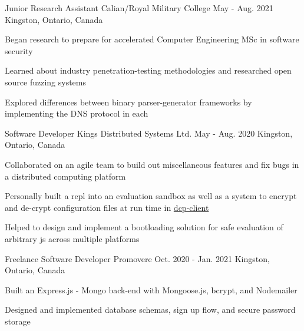 

\begin{cventries}

  \cventry
    {Junior Research Assistant} %
    {Calian/Royal Military College} %
    {May - Aug. 2021} %
    {Kingston, Ontario, Canada} %
    {
      \begin{cvitems} %
        \item{Began research to prepare for accelerated Computer Engineering MSc in software security}
        \item{Learned about industry penetration-testing methodologies and researched open source fuzzing systems}
        \item{Explored differences between binary parser-generator frameworks by implementing the DNS protocol in each}
      \end{cvitems}
    }

  \cventry
    {Software Developer} %
    {Kings Distributed Systems Ltd.} %
    {May - Aug. 2020} %
    {Kingston, Ontario, Canada} %
    {
      \begin{cvitems} %
        \item{Collaborated on an agile team to build out miscellaneous features and fix bugs in a distributed computing platform}
        \item{Personally built a repl into an evaluation sandbox as well as a system to encrypt and de-crypt configuration files at run time in \href{https://www.npmjs.com/package/dcp-client}{dcp-client}}
        \item{Helped to design and implement a bootloading solution for safe evaluation of arbitrary js across multiple platforms}
      \end{cvitems}
    }

  \cventry
    {Freelance Software Developer} %
    {Promovere} %
    {Oct. 2020 - Jan. 2021} %
    {Kingston, Ontario, Canada} %
    {
      \begin{cvitems} %
        \item {Built an Express.js - Mongo back-end with Mongoose.js, bcrypt, and Nodemailer}
        \item{Designed and implemented database schemas, sign up flow, and secure password storage}
      \end{cvitems}
    }


\end{cventries}
